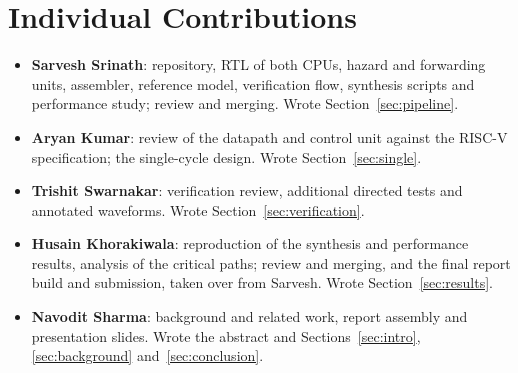 \section{Individual Contributions}
\label{sec:contributions}

\begin{itemize}
\item \textbf{Sarvesh Srinath}: repository, RTL of both CPUs, hazard and
forwarding units, assembler, reference model, verification flow, synthesis
scripts and performance study; review and merging. Wrote
Section~\ref{sec:pipeline}.
\item \textbf{Aryan Kumar}: review of the datapath and control unit against
the RISC-V specification; the single-cycle design. Wrote
Section~\ref{sec:single}.
\item \textbf{Trishit Swarnakar}: verification review, additional directed
tests and annotated waveforms. Wrote Section~\ref{sec:verification}.
\item \textbf{Husain Khorakiwala}: reproduction of the synthesis and
performance results, analysis of the critical paths; review and merging,
and the final report build and submission, taken over from Sarvesh. Wrote
Section~\ref{sec:results}.
\item \textbf{Navodit Sharma}: background and related work, report assembly
and presentation slides. Wrote the abstract and Sections~\ref{sec:intro},
\ref{sec:background} and~\ref{sec:conclusion}.
\end{itemize}
